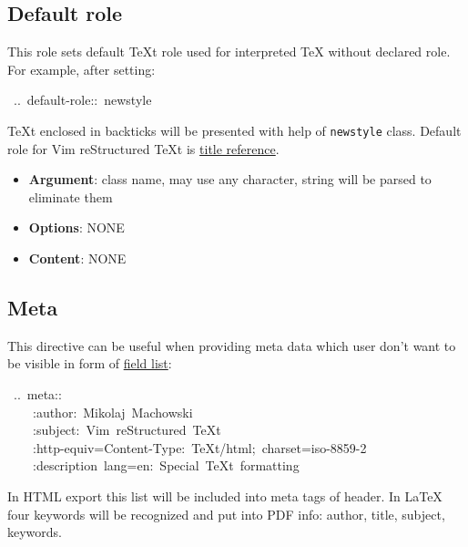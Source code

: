 \documentclass[12pt]{article}
\begin{document}
\subsection{Default role}

This role sets default \TeX{}t role used for interpreted \TeX{} without declared
role. For example, after setting:

\begin{ttfamily}\begin{flushleft}
\mbox{~..~default-role::~newstyle}\\
\end{flushleft}\end{ttfamily}

\TeX{}t enclosed in backticks will be presented with help of \texttt{newstyle} class.
Default role for Vim reStructured \TeX{}t is \href{\#ltitle-reference}{title reference}.

\begin{itemize}
\item
\textbf{Argument}: class name, may use any character, string will be parsed to
eliminate them

\item
\textbf{Options}: NONE

\item
\textbf{Content}: NONE
\end{itemize}
\hypertarget{lmeta}{}
\subsection{Meta}

This directive can be useful when providing meta data which user don't want to
be visible in form of \href{\#lfield-list}{field list}:

\begin{ttfamily}\begin{flushleft}
\mbox{~..~meta::}\\
\mbox{~~~~:author:~Mikolaj~Machowski}\\
\mbox{~~~~:subject:~Vim~reStructured~\TeX{}t}\\
\mbox{~~~~:http-equiv=Content-Type:~\TeX{}t/html;~charset=iso-8859-2}\\
\mbox{~~~~:description~lang=en:~Special~\TeX{}t~formatting}\\
\end{flushleft}\end{ttfamily}

In HTML export this list will be included into meta tags of header. In \LaTeX{}
four keywords will be recognized and put into PDF info: author, title,
subject, keywords.
\end{document}
